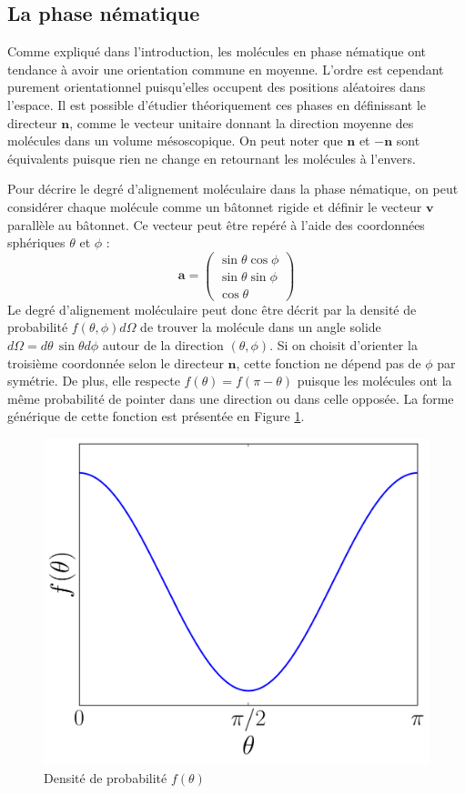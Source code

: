 \documentclass[11pt,a4paper]{article}
\numberwithin{equation}{section}
\begin{document}
\subsection{La phase nématique}
Comme expliqué dans l'introduction, les molécules en phase nématique ont tendance à avoir une orientation commune en moyenne. L'ordre est cependant purement orientationnel puisqu'elles occupent des positions aléatoires dans l'espace. Il est possible d’étudier théoriquement ces phases en définissant le directeur $\bm{n}$, comme le vecteur unitaire donnant la direction moyenne des molécules dans un volume mésoscopique. On peut noter que $\bm{n}$ et $-\bm{n}$ sont équivalents puisque rien ne change en retournant les molécules à l'envers.
\medskip

Pour décrire le degré d'alignement moléculaire dans la phase nématique, on peut considérer chaque molécule comme un bâtonnet rigide et définir le vecteur $\bm{v}$ parallèle au bâtonnet. Ce vecteur peut être repéré à l'aide des coordonnées sphériques $\theta$ et $\phi$ :
\begin{equation}
\bm{a} =
\begin{pmatrix}
 \sin \theta \cos \phi \\
 \sin \theta \sin \phi \\
 \cos \theta 
 \end{pmatrix} 
\end{equation}
Le degré d'alignement moléculaire peut donc être décrit par la densité de probabilité $f(\theta,\phi)d\Omega$ de trouver la molécule dans un angle solide $d\Omega = d\theta\, \sin \theta d\phi$ autour de la direction $(\theta,\phi)$. Si on choisit d'orienter la troisième coordonnée selon le directeur $\bm{n}$, cette fonction ne dépend pas de $\phi$ par symétrie. De plus, elle respecte $f(\theta) = f(\pi - \theta)$ puisque les molécules ont la même probabilité de pointer dans une direction ou dans celle opposée. La forme générique de cette fonction est présentée en Figure \ref{distrib}.

\begin{figure}[h]
    \centering	    
	\includegraphics[scale=0.4]{figures/distrib.pdf}
    \caption{Densité de probabilité $f(\theta)$}
    	\label{distrib} 
\end{figure}
\end{document}
